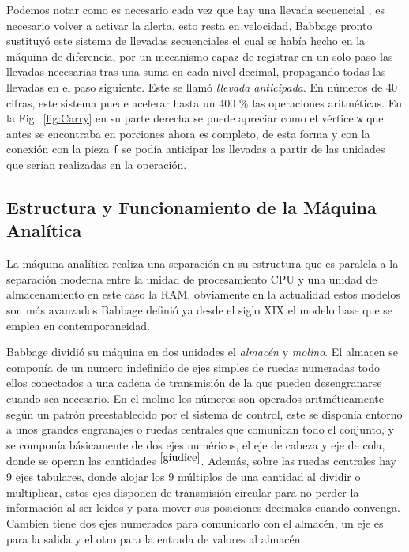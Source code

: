 \documentclass[runningheads,a4paper]{llncs}
\begin{document}
Podemos notar como es necesario cada vez que hay una llevada secuencial , es necesario volver a activar la
alerta, esto resta en velocidad, Babbage pronto sustituyó este sistema de llevadas secuenciales el cual 
se había hecho en la máquina de diferencia, por un mecanismo capaz de registrar en un solo paso las
llevadas necesarias tras una suma en cada nivel decimal, propagando todas las llevadas en el paso siguiente. 
Este se llamó \emph{llevada anticipada}. En números de 40 cifras, este sistema puede acelerar hasta un 
400 \% las operaciones aritméticas. En la Fig.~\ref{fig:Carry} en su parte derecha se puede apreciar como 
el vértice \verb*|w| que antes se encontraba en porciones ahora es completo, de esta forma y con la conexión 
con la pieza \verb*|f| se podía anticipar las llevadas a partir de las unidades que serían realizadas en 
la operación.

\subsection*{Estructura y Funcionamiento de la Máquina Analítica}

La máquina analítica realiza una separación en su estructura que es paralela a la separación moderna entre 
la unidad de procesamiento CPU y una unidad de almacenamiento en este caso la RAM, obviamente en la 
actualidad estos modelos son más avanzados Babbage definió ya desde el siglo XIX el modelo base que se 
emplea en contemporaneidad.

Babbage dividió su máquina en dos unidades el \emph{almacén} y \emph{molino}. El almacen se componía de un
numero indefinido de ejes simples de ruedas numeradas todo ellos conectados a una cadena de transmisión de 
la que pueden desengranarse cuando sea necesario. En el molino los números son operados aritméticamente 
según un patrón preestablecido por el sistema de control, este se disponía entorno a unos grandes engranajes 
o ruedas centrales que comunican todo el conjunto, y se componía básicamente de dos ejes numéricos, el eje
de cabeza y eje de cola, donde se operan las cantidades $^{\cite{giudice}}$. Además, sobre las ruedas centrales hay 9 ejes tabulares, donde alojar los 9 múltiplos de una cantidad al dividir o multiplicar, estos ejes disponen de 
transmisión circular para no perder la información al ser leídos y para mover sus posiciones decimales 
cuando convenga. Cambien tiene dos ejes numerados para comunicarlo con el almacén, un eje es para la salida
y el otro para la entrada de valores al almacén.
\end{document}
